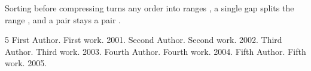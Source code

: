 \documentclass{article}
\begin{document}
Sorting before compressing turns any order into ranges \cite{d,b,c,a}, a
single gap splits the range \cite{e,a,b,d}, and a pair stays a pair
\cite{e,d}.

\begin{thebibliography}{5}
 First Author. First work. 2001.
 Second Author. Second work. 2002.
 Third Author. Third work. 2003.
 Fourth Author. Fourth work. 2004.
 Fifth Author. Fifth work. 2005.
\end{thebibliography}
\end{document}
